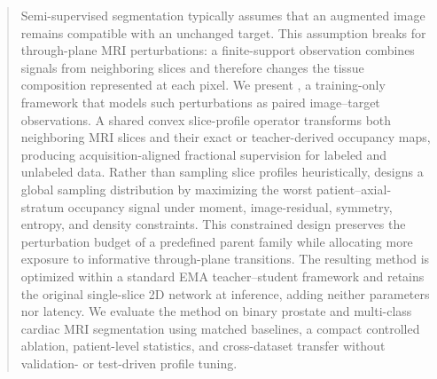 \begin{abstract}
Semi-supervised segmentation typically assumes that an augmented image remains compatible with an unchanged target. This assumption breaks for through-plane MRI perturbations: a finite-support observation combines signals from neighboring slices and therefore changes the tissue composition represented at each pixel. We present \method, a training-only framework that models such perturbations as paired image--target observations. A shared convex slice-profile operator transforms both neighboring MRI slices and their exact or teacher-derived occupancy maps, producing acquisition-aligned fractional supervision for labeled and unlabeled data. Rather than sampling slice profiles heuristically, \method designs a global sampling distribution by maximizing the worst patient--axial-stratum occupancy signal under moment, image-residual, symmetry, entropy, and density constraints. This constrained design preserves the perturbation budget of a predefined parent family while allocating more exposure to informative through-plane transitions. The resulting method is optimized within a standard EMA teacher--student framework and retains the original single-slice 2D network at inference, adding neither parameters nor latency. We evaluate the method on binary prostate and multi-class cardiac MRI segmentation using matched baselines, a compact controlled ablation, patient-level statistics, and cross-dataset transfer without validation- or test-driven profile tuning.
\end{abstract}
